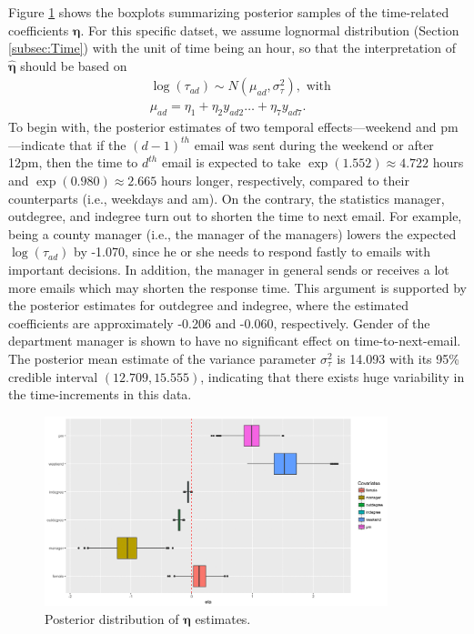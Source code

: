 \documentclass[ba]{imsart}
\numberwithin{equation}{section}
\theoremstyle{plain}
\begin{document}
	Figure \ref{figure:etaresults} shows the boxplots summarizing posterior samples of the time-related coefficients $\boldsymbol{\eta}$. For this specific datset, we assume lognormal distribution (Section \ref{subsec:Time}) with the unit of time being an hour, so that the interpretation of $\hat{\boldsymbol{\eta}}$ should be based on
	\begin{equation*}
	\begin{aligned}
	&\log(\tau_{ad}) \sim N(\mu_{ad}, \sigma_\tau^2), \mbox{ with }\\
	&\mu_{ad} = \eta_{1}+\eta_{2} y_{ad2}\ldots+\eta_{7}y_{ad7}.
	\end{aligned}
	\end{equation*}
	To begin with, the posterior estimates of two temporal effects---weekend and pm---indicate that if the ${(d-1)}^{th}$ email was sent during the weekend or after 12pm, then the time to $d^{th}$ email is expected to take $\exp(1.552)\approx 4.722$ hours and $\exp(0.980)\approx2.665$ hours longer, respectively, compared to their counterparts (i.e., weekdays and am). On the contrary, the statistics manager, outdegree, and indegree turn out to shorten the time to next email. For example, being a county manager (i.e., the manager of the managers) lowers the expected $\log(\tau_{ad})$ by -1.070, since he or she needs to respond fastly to emails with important decisions. In addition, the manager in general sends or receives a lot more emails which may shorten the response time. This argument is supported by the posterior estimates for outdegree and indegree, where the estimated coefficients are approximately -0.206 and -0.060, respectively. Gender of the department manager is shown to have no significant effect on time-to-next-email. The posterior mean estimate of the variance parameter $\sigma^2_\tau$ is 14.093 with its 95\% credible interval $(12.709, 15.555)$, indicating that there exists huge variability in the time-increments in this data.
		\begin{figure}[!t]
			\centering
			\includegraphics[width=0.89\textwidth]{img/etaest-1.png}	
			\caption {Posterior distribution of $\boldsymbol{\eta}$ estimates.}
			\label{figure:etaresults}
		\end{figure}
	
\end{document}

